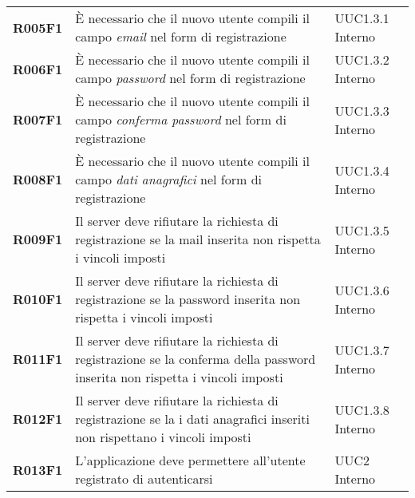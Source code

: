 \documentclass[../analisi-dei-requisiti.tex]{subfiles}
\begin{document}
\begin{longtable}[H]{>{\centering\bfseries}m{3cm} >{\centering}m{10cm} >{\centering\arraybackslash}m{3cm}}
  R005F1                               & È necessario che il nuovo utente compili il campo \textit{email} nel form di registrazione                                                                                                              & UUC1.3.1 Interno              \\
  R006F1                               & È necessario che il nuovo utente compili il campo \textit{password} nel form di registrazione                                                                                                           & UUC1.3.2 Interno              \\
  R007F1                               & È necessario che il nuovo utente compili il campo \textit{conferma password} nel form di registrazione                                                                                                  & UUC1.3.3 Interno              \\
  R008F1                               & È necessario che il nuovo utente compili il campo \textit{dati anagrafici} nel form di registrazione                                                                                                    & UUC1.3.4 Interno              \\
  R009F1                               & Il server deve rifiutare la richiesta di registrazione se la mail inserita non rispetta i vincoli imposti                                                                                               & UUC1.3.5 Interno              \\
  R010F1                               & Il server deve rifiutare la richiesta di registrazione se la password inserita non rispetta i vincoli imposti                                                                                           & UUC1.3.6 Interno              \\
  R011F1                               & Il server deve rifiutare la richiesta di registrazione se la conferma della password inserita non rispetta i vincoli imposti                                                                            & UUC1.3.7 Interno              \\
  R012F1                               & Il server deve rifiutare la richiesta di registrazione se la i dati anagrafici inseriti non rispettano i vincoli imposti                                                                                & UUC1.3.8 Interno              \\
  R013F1                               & L'applicazione deve permettere all'utente registrato di autenticarsi                                                                                                                                    & UUC2 Interno                  \\

\end{longtable}
\end{document}

